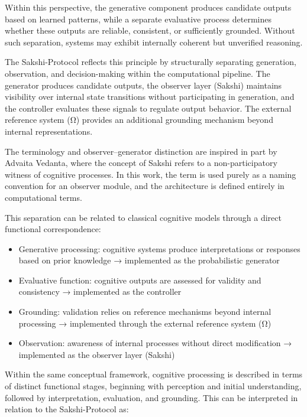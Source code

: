 \documentclass[12pt,a4paper]{article}
\begin{document}
Within this perspective, the generative component produces candidate outputs based on learned patterns, while a separate evaluative process determines whether these outputs are reliable, consistent, or sufficiently grounded. Without such separation, systems may exhibit internally coherent but unverified reasoning.

The Sakshi-Protocol reflects this principle by structurally separating generation, observation, and decision-making within the computational pipeline. The generator produces candidate outputs, the observer layer (Sakshi) maintains visibility over internal state transitions without participating in generation, and the controller evaluates these signals to regulate output behavior. The external reference system (Ω) provides an additional grounding mechanism beyond internal representations.

The terminology and observer–generator distinction are inspired in part by Advaita Vedanta, where the concept of Sakshi refers to a non-participatory witness of cognitive processes. In this work, the term is used purely as a naming convention for an observer module, and the architecture is defined entirely in computational terms.

This separation can be related to classical cognitive models through a direct functional correspondence:

\begin{itemize}
    \item Generative processing: cognitive systems produce interpretations or responses based on prior knowledge → implemented as the probabilistic generator
    \item Evaluative function: cognitive outputs are assessed for validity and consistency → implemented as the controller
    \item Grounding: validation relies on reference mechanisms beyond internal processing → implemented through the external reference system (Ω)
    \item Observation: awareness of internal processes without direct modification → implemented as the observer layer (Sakshi)
\end{itemize}

Within the same conceptual framework, cognitive processing is described in terms of distinct functional stages, beginning with perception and initial understanding, followed by interpretation, evaluation, and grounding. This can be interpreted in relation to the Sakshi-Protocol as:
\end{document}
